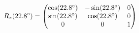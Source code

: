 \documentclass[preview]{standalone}
\begin{document}
\begin{align*}
\special{dvisvgm:raw <g id='unique000'>}R_z(22.8^\circ) = \begin{pmatrix} \cos(22.8^\circ) & -\sin(22.8^\circ) & 0 \\ \sin(22.8^\circ) & \cos(22.8^\circ) & 0 \\ 0 & 0 & 1 \end{pmatrix}\special{dvisvgm:raw </g>}
\end{align*}
\end{document}
